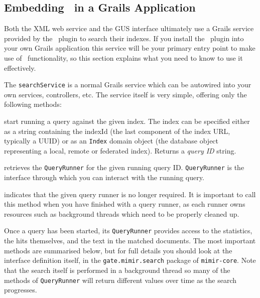 
\subsection{Embedding \Mimir\ in a Grails Application}
\label{sec:search:grails}

Both the XML web service and the GUS interface ultimately use a Grails service
provided by the \Mimir\ plugin to search their indexes.  If you install the
\Mimir\ plugin into your own Grails application this service will be your
primary entry point to make use of \Mimir\ functionality, so this section
explains what you need to know to use it effectively.

The {\tt searchService} is a normal Grails service which can be autowired into
your own services, controllers, etc.  The service itself is very simple,
offering only the following methods:

\bde
\item[postQuery(index, queryString)] start running a query against the given
  index.  The index can be specified either as a string containing the indexId
  (the last component of the index URL, typically a UUID) or as an {\tt Index}
  domain object (the database object representing a local, remote or federated
  index).  Returns a {\em query ID} string.
\item[getQueryRunner(queryId)] retrieves the {\tt QueryRunner} for the given
  running query ID.  {\tt QueryRunner} is the interface through which you can
  interact with the running query.
\item[closeQueryRunner(queryId)] indicates that the given query runner is no
  longer required.  It is important to call this method when you have finished
  with a query runner, as each runner owns resources such as background threads
  which need to be properly cleaned up.
\ede

Once a query has been started, its {\tt QueryRunner} provides access to the
statistics, the hits themselves, and the text in the matched documents.  The
most important methods are summarised below, but for full details you should
look at the interface definition itself, in the {\tt gate.mimir.search} package
of {\tt mimir-core}.  Note that the search itself is performed in a background
thread so many of the methods of {\tt QueryRunner} will return different values
over time as the search progresses.

